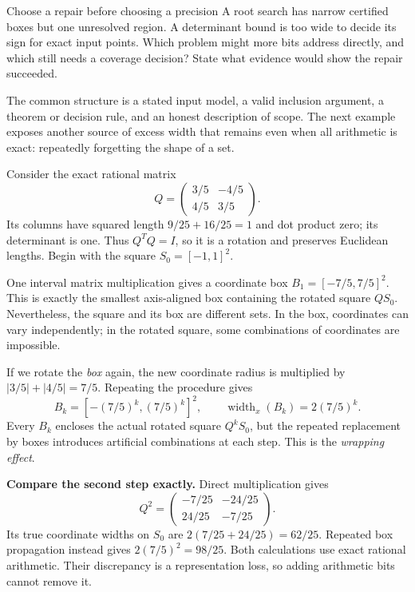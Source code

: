 \begin{question}{Choose a repair before choosing a precision}
A root search has narrow certified boxes but one unresolved region. A
determinant bound is too wide to decide its sign for exact input points.
Which problem might more bits address directly, and which still needs a
coverage decision? State what evidence would show the repair succeeded.
\end{question}

The common structure is a stated input model, a valid inclusion argument,
a theorem or decision rule, and an honest description of scope. The next
example exposes another source of excess width that remains even when all
arithmetic is exact: repeatedly forgetting the shape of a set.

\newpage
{}
Consider the exact rational matrix
\[
 Q=\begin{pmatrix}3/5&-4/5\\4/5&3/5\end{pmatrix}.
\]
Its columns have squared length $9/25+16/25=1$ and dot product zero;
its determinant is one. Thus $Q^TQ=I$, so it is a rotation and preserves
Euclidean lengths. Begin with the square $S_0=[-1,1]^2$.

One interval matrix multiplication gives a coordinate box
$B_1=[-7/5,7/5]^2$. This is exactly the smallest axis-aligned box
containing the rotated square $QS_0$. Nevertheless, the square and its
box are different sets. In the box, coordinates can vary independently;
in the rotated square, some combinations of coordinates are impossible.

If we rotate the \emph{box} again, the new coordinate radius is multiplied
by $|3/5|+|4/5|=7/5$. Repeating the procedure gives
\[
               B_k=[-(7/5)^k,(7/5)^k]^2,
 \qquad \operatorname{width}_x(B_k)=2(7/5)^k.
\]
Every $B_k$ encloses the actual rotated square $Q^kS_0$, but the repeated
replacement by boxes introduces artificial combinations at each step.
This is the \emph{wrapping effect}.

\textbf{Compare the second step exactly.} Direct multiplication gives
\[
 Q^2=\begin{pmatrix}-7/25&-24/25\\24/25&-7/25\end{pmatrix}.
\]
Its true coordinate widths on $S_0$ are $2(7/25+24/25)=62/25$.
Repeated box propagation instead gives $2(7/5)^2=98/25$. Both calculations
use exact rational arithmetic. Their discrepancy is a representation loss,
so adding arithmetic bits cannot remove it.


